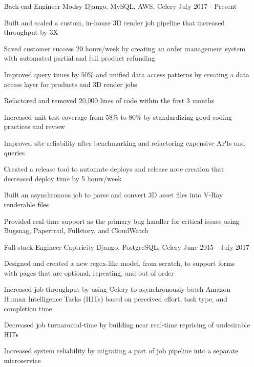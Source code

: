 \begin{cventries}
  \cventry
    {Back-end Engineer}
    {Modsy}
    {Django, MySQL, AWS, Celery}
    {July 2017 - Present}
    {
      \begin{cvitems}
        \item {Built and scaled a custom, in-house 3D render job pipeline that increased throughput by 3X}
        \item {Saved customer success 20 hours/week by creating an order management system with automated partial and full product refunding}
        \item {Improved query times by 50\% and unified data access patterns by creating a data access layer for products and 3D render jobs}
        \item {Refactored and removed 20,000 lines of code within the first 3 months}
        \item {Increased unit test coverage from 58\% to 80\% by standardizing good coding practices and review}
        \item {Improved site reliability after benchmarking and refactoring expensive APIs and queries}
        \item {Created a release tool to automate deploys and release note creation that decreased deploy time by 5 hours/week}
        \item {Built an asynchronous job to parse and convert 3D asset files into V-Ray renderable files}
        \item {Provided real-time support as the primary bug handler for critical issues using Bugsnag, Papertrail, Fullstory, and CloudWatch}
      \end{cvitems}
    }
  \cventry
    {Full-stack Engineer}
    {Captricity}
    {Django, PostgreSQL, Celery}
    {June 2015 - July 2017}
    {
      \begin{cvitems}
        \item {Designed and created a new regex-like model, from scratch, to support forms with pages that are optional, repeating, and out of order}
        \item {Increased job throughput by using Celery to asynchronously batch Amazon Human Intelligence Tasks (HITs) based on perceived effort, task type, and completion time}
        \item {Decreased job turnaround-time by building near real-time repricing of undesirable HITs}
        \item {Increased system reliability by migrating a part of job pipeline into a separate microservice}

\end{cvitems}}
\end{cventries}
